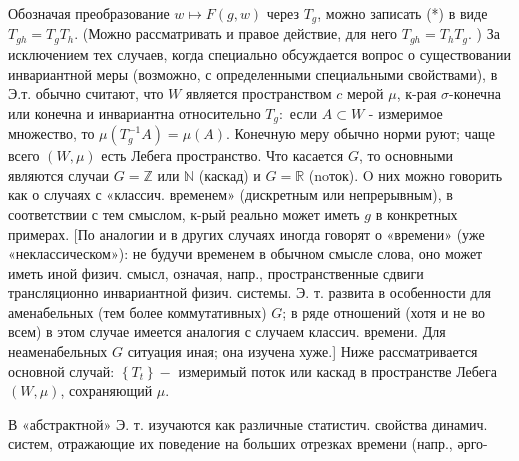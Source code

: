 \documentclass[10pt]{article}
\begin{document}
Обозначая преобразование $w \longmapsto F(g, w)$ через $T_{g}$, можно записать (*) в виде $T_{g h}=T_{g} T_{h}$. (Можно рассматривать и правое действие, для него $T_{g h}=T_{h} T_{g}$. ) За исключением тех случаев, когда специально обсуждается вопрос о существовании инвариантной меры (возможно, с определенными специальными свойствами), в Э.т. обычно считают, что $W$ является пространством $c$ мерой $\mu$, к-рая $\sigma$-конечна или конечна и инвариантна относительно $T_{g}:$ если $A \subset W$ - измеримое множество, то $\mu\left(T_{g}^{-1} A\right)=\mu(A)$. Конечную меру обычно норми руют; чаще всего $(W, \mu)$ есть Лебега пространство. Что касается $G$, то основными являются случаи $G=\mathbb{Z}$ или $\mathbb{N}$ (каскад) и $G=\mathbb{R}$ (noток). $\mathrm{O}$ них можно говорить как о случаях с «классич. временем» (дискретным или непрерывным), в соответствии с тем смыслом, к-рый реально может иметь $g$ в конкретных примерах. [По аналогии и в других случаях иногда говорят о «времени» (уже «неклассическом»): не будучи временем в обычном смысле слова, оно может иметь иной физич. смысл, означая, напр., пространственные сдвиги трансляционно инвариантной физич. системы. Э. т. развита в особенности для аменабельных (тем более коммутативных) $G$; в ряде отношений (хотя и не во всем) в этом случае имеется аналогия с случаем классич. времени. Для неаменабельных $G$ ситуация иная; она изучена хуже.] Ниже рассматривается основной случай: $\left\{T_{t}\right\}-$ измеримый поток или каскад в пространстве Лебега $(W, \mu)$, сохраняющий $\mu$.



В «абстрактной» Э. т. изучаются как различные статистич. свойства динамич. систем, отражающие их поведение на больших отрезках времени (напр., әрго-
\end{document}

